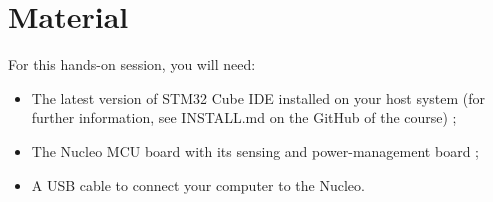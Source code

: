 \section*{Material}

\begin{comment}[couleur = gray!20, arrondi = 0.2, logo=\bcinfo]{}
\vspace{0.2cm}
\end{comment}
For this hands-on session, you will need:
\begin{itemize}
    \item The latest version of STM32 Cube IDE installed on your host system (for further information, see INSTALL.md on the GitHub of the course) ;
    \item The Nucleo MCU board with its sensing and power-management board ;
    \item A USB cable to connect your computer to the Nucleo.
\end{itemize}

